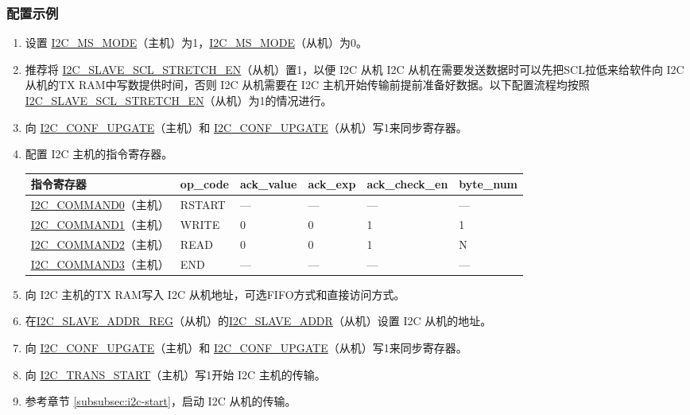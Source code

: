 \documentclass[main\_\_CN.tex]{subfiles}
\begin{document}
\subsubsection{配置示例}
\begin{enumerate}
\item 设置 \hyperref[fielddesc:I2CMSMODE]{I2C\_MS\_MODE}（主机）为1，\hyperref[fielddesc:I2CMSMODE]{I2C\_MS\_MODE}（从机）为0。
\item 推荐将 \hyperref[fielddesc:I2CSLAVESCLSTRETCHEN]{I2C\_SLAVE\_SCL\_STRETCH\_EN}（从机）置1，以便 I2C 从机 I2C 从机在需要发送数据时可以先把SCL拉低来给软件向 I2C 从机的TX RAM中写数提供时间，否则 I2C 从机需要在 I2C 主机开始传输前提前准备好数据。以下配置流程均按照\hyperref[fielddesc:I2CSLAVESCLSTRETCHEN]{I2C\_SLAVE\_SCL\_STRETCH\_EN}（从机）为1的情况进行。 
\item 向 \hyperref[fielddesc:I2CCONFUPGATE]{I2C\_CONF\_UPGATE}（主机）和 \hyperref[fielddesc:I2CCONFUPGATE]{I2C\_CONF\_UPGATE}（从机）写1来同步寄存器。
\item 配置 I2C 主机的指令寄存器。
\begin{longtable}{ | p{4cm} | p{2cm} | p{2cm} | p{2cm} |p{2cm} | p{2cm} |}
\hline\rowcolor{lightgray}
指令寄存器& op\_code & ack\_value&ack\_exp&ack\_check\_en&byte\_num  \\ \hline
\hyperref[fielddesc:I2CCOMMAND0]{I2C\_COMMAND0}（主机）& RSTART& ---&---&---&---  \\ \hline
\hyperref[fielddesc:I2CCOMMAND1]{I2C\_COMMAND1}（主机）& WRITE& 0&0&1&1  \\ \hline
\hyperref[fielddesc:I2CCOMMAND2]{I2C\_COMMAND2}（主机）& READ& 0&0&1&N  \\ \hline
\hyperref[fielddesc:I2CCOMMAND3]{I2C\_COMMAND3}（主机）& END& ---&---&---&---  \\ \hline
\end{longtable}
\item 向 I2C 主机的TX RAM写入 I2C 从机地址，可选FIFO方式和直接访问方式。
\item 在\hyperref[regdesc:I2CSLAVEADDRREG]{I2C\_SLAVE\_ADDR\_REG}（从机）的\hyperref[fielddesc:I2CSLAVEADDR]{I2C\_SLAVE\_ADDR}（从机）设置 I2C 从机的地址。
\item 向 \hyperref[fielddesc:I2CCONFUPGATE]{I2C\_CONF\_UPGATE}（主机）和 \hyperref[fielddesc:I2CCONFUPGATE]{I2C\_CONF\_UPGATE}（从机）写1来同步寄存器。
\item 向 \hyperref[fielddesc:I2CTRANSSTART]{I2C\_TRANS\_START}（主机）写1开始 I2C 主机的传输。
\item 参考章节 \ref{subsubsec:i2c-start}，启动 I2C 从机的传输。

\end{enumerate}
\end{document}
